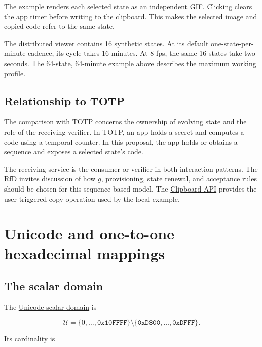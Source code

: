 \documentclass[
  11pt,
  a4paper,
]{article}
\begin{document}
The example renders each selected state as an independent GIF. Clicking
clears the app timer before writing to the clipboard. This makes the
selected image and copied code refer to the same state.

The distributed viewer contains 16 synthetic states. At its default
one-state-per-minute cadence, its cycle takes 16 minutes. At 8 fps, the
same 16 states take two seconds. The 64-state, 64-minute example above
describes the maximum working profile.

\hypertarget{relationship-to-totp}{%
\subsection{Relationship to TOTP}\label{relationship-to-totp}}

The comparison with
\href{https://www.rfc-editor.org/rfc/rfc6238.html}{TOTP} concerns the
ownership of evolving state and the role of the receiving verifier. In
TOTP, an app holds a secret and computes a code using a temporal
counter. In this proposal, the app holds or obtains a sequence and
exposes a selected state's code.

The receiving service is the consumer or verifier in both interaction
patterns. The RfD invites discussion of how \(g\), provisioning, state
renewal, and acceptance rules should be chosen for this sequence-based
model. The \href{https://www.w3.org/TR/clipboard-apis/}{Clipboard API}
provides the user-triggered copy operation used by the local example.

\hypertarget{unicode-and-one-to-one-hexadecimal-mappings}{%
\section{Unicode and one-to-one hexadecimal
mappings}\label{unicode-and-one-to-one-hexadecimal-mappings}}

\hypertarget{the-scalar-domain}{%
\subsection{The scalar domain}\label{the-scalar-domain}}

The
\href{https://www.unicode.org/versions/Unicode18.0.0/core-spec/chapter-3/}{Unicode
scalar domain} is

\[
\mathcal U=
\{0,\ldots,\mathtt{0x10FFFF}\}
\setminus
\{\mathtt{0xD800},\ldots,\mathtt{0xDFFF}\}.
\]

Its cardinality is
\end{document}

